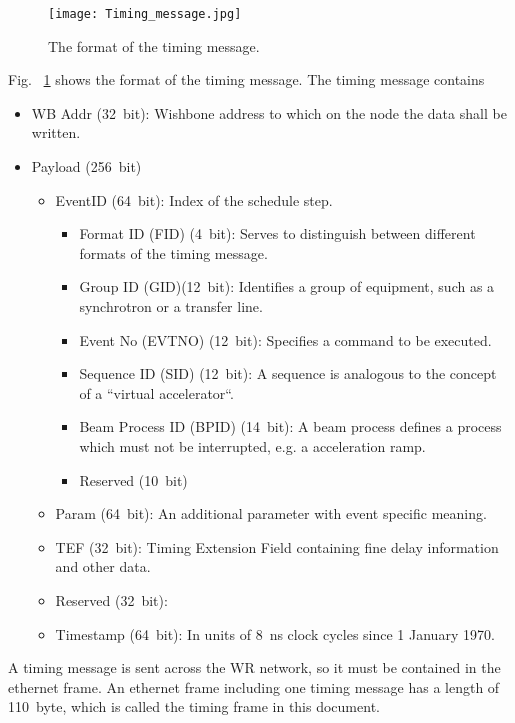 \begin{figure}[!htb]
   \centering   
   \texttt{[image: Timing\_message.jpg]}
   \caption{The format of the timing message.}
   \label{Timing_message}
\end{figure}
Fig. ~\ref{Timing_message} shows the format of the timing message. 
The timing message contains 
\begin{itemize}
	\item WB Addr (\SI{32}{bit}): Wishbone address to which on the node the data shall be written.
	\item Payload (\SI{256}{bit})
		\begin{itemize}
			\item EventID (\SI{64}{bit}): Index of the schedule step.
		\begin{itemize}
			\item Format ID (FID) (\SI{4}{bit}): Serves to distinguish between different formats of the timing message.
			\item Group ID (GID)(\SI{12}{bit}): Identifies a group of equipment, such as a synchrotron or a transfer line.
			\item Event No (EVTNO) (\SI{12}{bit}): Specifies a command to be executed.
			\item Sequence ID (SID) (\SI{12}{bit}): A sequence is analogous to the concept of a ``virtual accelerator``. 
			\item Beam Process ID (BPID) (\SI{14}{bit}): A beam process defines a process which must not be interrupted, e.g. a acceleration ramp. 
			\item Reserved (\SI{10}{bit})
		\end{itemize}
			\item Param (\SI{64}{bit}): An additional parameter with event specific meaning.
			\item TEF (\SI{32}{bit}): Timing Extension Field containing fine delay information and other data.
			\item Reserved (\SI{32}{bit}): 
			\item Timestamp (\SI{64}{bit}): In units of \SI{8}{\ns} clock cycles since 1 January 1970.
		\end{itemize}
\end{itemize}
A timing message is sent across the WR network, so it must be contained in the ethernet frame. An ethernet frame including one timing message has a length of \SI{110}{byte}, which is called the timing frame in this document.

